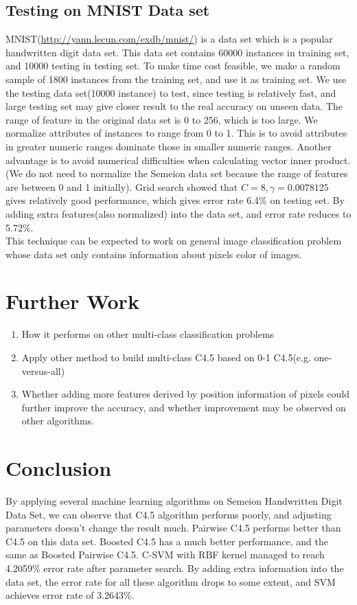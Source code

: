 \documentclass[a4paper,11pt]{article}
\begin{document}
\subsection{Testing on MNIST Data set}
MNIST(\url{http://yann.lecun.com/exdb/mnist/}) is a data set which is a popular handwritten digit data set. This data set contains 60000 instances in training set, and 10000 testing in testing set. To make time cost feasible, we make a random sample of 1800 instances from the training set, and use it as training set. We use the testing data set(10000 instance) to test, since testing is relatively fast, and large testing set may give closer result to the real accuracy on unseen data. The range of feature in the original data set is 0 to 256, which is too large. We normalize attributes of instances to range from 0 to 1. This is to avoid attributes in greater numeric ranges dominate those in smaller numeric ranges. Another advantage is to avoid numerical difficulties when calculating vector inner product\cite{SVM}.(We do not need to normalize the Semeion data set because the range of features are between 0 and 1 initially). Grid search showed that $C=8, \gamma=0.0078125$ gives relatively good performance, which gives error rate  6.4\% on testing set. By adding extra features(also normalized) into the data set, and error rate reduces to 5.72\%.\\
This technique can be expected to work on general image classification problem whose data set only contains information about pixels color of images.

\section{Further Work}
\begin{enumerate}
 \item How it performs on other multi-class classification problems
 \item Apply other method to build multi-class C4.5 based on 0-1 C4.5(e.g. one-versus-all)
 \item Whether adding more features derived by position information of pixels could further improve the accuracy, and whether improvement may be observed on other algorithms.
\end{enumerate}
\section{Conclusion}
By applying several machine learning algorithms on Semeion Handwritten Digit Data Set, we can observe that C4.5 algorithm performs poorly, and adjusting parameters doesn't change the result much. Pairwise C4.5 performs better than C4.5 on this data set. Boosted C4.5 has a much better performance, and the same as Boosted Pairwise C4.5. C-SVM with RBF kernel managed to reach 4.2059\% error rate after parameter search. By adding extra information into the data set, the error rate for all these algorithm drops to some extent, and SVM achieves error rate of 3.2643\%.



\end{document}
